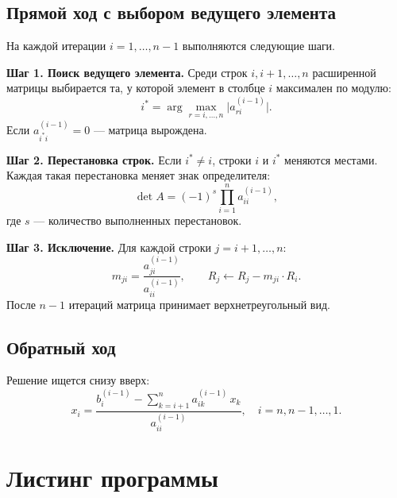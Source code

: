 \documentclass[a4paper,12pt]{article}
\begin{document}
\subsection{Прямой ход с выбором ведущего элемента}

На каждой итерации $i = 1,\ldots,n-1$ выполняются следующие шаги.

\textbf{Шаг 1. Поиск ведущего элемента.}
Среди строк $i, i+1, \ldots, n$ расширенной матрицы выбирается та,
у которой элемент в столбце $i$ максимален по модулю:
\[
    i^* = \arg\max_{r=i,\ldots,n} \bigl|a_{ri}^{(i-1)}\bigr|.
\]
Если $a_{i^*i}^{(i-1)} = 0$ --- матрица вырождена.

\textbf{Шаг 2. Перестановка строк.}
Если $i^* \neq i$, строки $i$ и $i^*$ меняются местами.
Каждая такая перестановка меняет знак определителя:
\[
    \det A = (-1)^{s} \prod_{i=1}^{n} a_{ii}^{(i-1)},
\]
где $s$ --- количество выполненных перестановок.

\textbf{Шаг 3. Исключение.}
Для каждой строки $j = i+1,\ldots,n$:
\[
    m_{ji} = \frac{a_{ji}^{(i-1)}}{a_{ii}^{(i-1)}}, \qquad
    R_j \leftarrow R_j - m_{ji} \cdot R_i.
\]
После $n-1$ итераций матрица принимает верхнетреугольный вид.

\subsection{Обратный ход}

Решение ищется снизу вверх:
\[
    x_i = \frac{b_i^{(i-1)} - \displaystyle\sum_{k=i+1}^{n} a_{ik}^{(i-1)}\,x_k}{a_{ii}^{(i-1)}},
    \quad i = n, n-1, \ldots, 1.
\]

\newpage

\section{Листинг программы}
\end{document}
